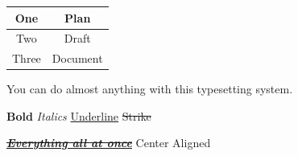 \documentclass[12pt]{article}
\begin{document}
\begin{table}[h]
    \centering
    \begin{tabular}{|c|c|}
        \hline
        One & Plan \\
        \hline
        Two & Draft \\
        \hline
        Three & Document \\
        \hline
    \end{tabular}
\end{table}

You can do almost anything with this typesetting system.

\textbf{Bold}
\textit{Italics}
\underline{Underline}
\sout{Strike}

\begin{center}
    \underline{\sout{\textbf{\textit{Everything all at once}}}} Center Aligned
\end{center}
\end{document}
